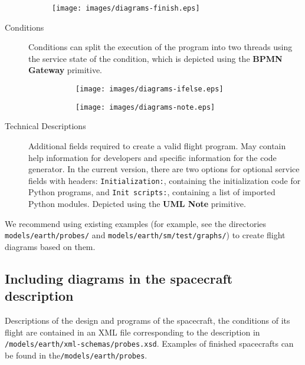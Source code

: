 \documentclass[12pt,a4paper]{article}
\begin{document}
\begin{description}
\begin{figure}[h]
  \begin{center}
    \texttt{[image: images/diagrams-finish.eps]}
  \end{center}
\end{figure}

\item[Conditions] Conditions can split the execution of the program into two threads using the service state of the condition, which is depicted using the \textbf{BPMN Gateway} primitive.

\begin{figure}[h]
  \begin{center}
    \begin{subfigure}{0.4\textwidth}
      \texttt{[image: images/diagrams-ifelse.eps]}
    \end{subfigure}
    \hfill
    \begin{subfigure}{0.4\textwidth}
      \texttt{[image: images/diagrams-note.eps]}
    \end{subfigure}
  \end{center}
\end{figure}

\item[Technical Descriptions] Additional fields required to create a valid flight program. May contain help information for developers and specific information for the code generator. In the current version, there are two options for optional service fields with headers: \verb'Initialization:', containing the initialization code for Python programs, and \verb'Init scripts:', containing a list of imported Python modules. Depicted using the \textbf{UML Note} primitive.

\end{description}

We recommend using existing examples (for example, see the directories
\verb'models/earth/probes/' and \verb'models/earth/sm/test/graphs/') to create flight diagrams based on them.

\subsection*{Including diagrams in the spacecraft description}

Descriptions of the design and programs of the spacecraft, the conditions of its flight are contained in an XML file corresponding to the description in \verb'/models/earth/xml-schemas/probes.xsd'. Examples of finished spacecrafts can be found in the\verb'/models/earth/probes'.
\end{document}
